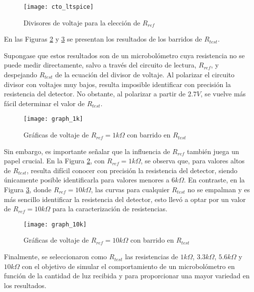            \begin{figure}[hbtp]
                \centering
                \texttt{[image: cto\_ltspice]}
                \caption{Divisores de voltaje para la elección de $R_{ref}$}
                \label{fig:cto_ltspice}
            \end{figure}


En las Figuras \ref{fig:graph_1k} y \ref{fig:graph_10k} se presentan los resultados de los barridos de $R_{test}$.


Supongase que estos resultados son de un microbolómetro cuya resistencia no se puede medir directamente, salvo a través del circuito de lectura, $R_{ref}$, y despejando $R_{test}$ de la ecuación del divisor de voltaje. Al polarizar el circuito divisor con voltajes muy bajos, resulta imposible identificar con precisión la resistencia del detector. No obstante, al polarizar a partir de $2.7V$, se vuelve más fácil determinar el valor de $R_{test}$.

            \begin{figure}[hbtp]
                \centering
                \texttt{[image: graph\_1k]}
                \caption{Gráficas de voltaje de $R_{ref} = 1k\Omega$ con barrido en $R_{test}$}
                \label{fig:graph_1k}
            \end{figure}
            
Sin embargo, es importante señalar que la influencia de $R_{ref}$ también juega un papel crucial. En la Figura \ref{fig:graph_1k}, con $R_{ref} = 1k\Omega$, se observa que, para valores altos de $R_{test}$, resulta difícil conocer con precisión la resistencia del detector, siendo únicamente posible identificarla para valores menores a $6k\Omega$. En contraste, en la Figura \ref{fig:graph_10k}, donde $R_{ref} = 10k\Omega$, las curvas para cualquier $R_{test}$ no se empalman y es más sencillo identificar la resistencia del detector, esto llevó a optar por un valor de $R_{ref} = 10k\Omega$ para la caracterización de resistencias.
 
            \begin{figure}[hbtp]
                \centering
                \texttt{[image: graph\_10k]}
                \caption{Gráficas de voltaje de $R_{ref} = 10k\Omega$ con barrido en $R_{test}$}
                \label{fig:graph_10k}
            \end{figure}

Finalmente, se seleccionaron como $R_{test}$ las resistencias de $1k\Omega$, $3.3k\Omega$, $5.6k\Omega$ y $10k\Omega$ con el objetivo de simular el comportamiento de un microbolómetro en función de la cantidad de luz recibida y para proporcionar una mayor variedad en los resultados.


